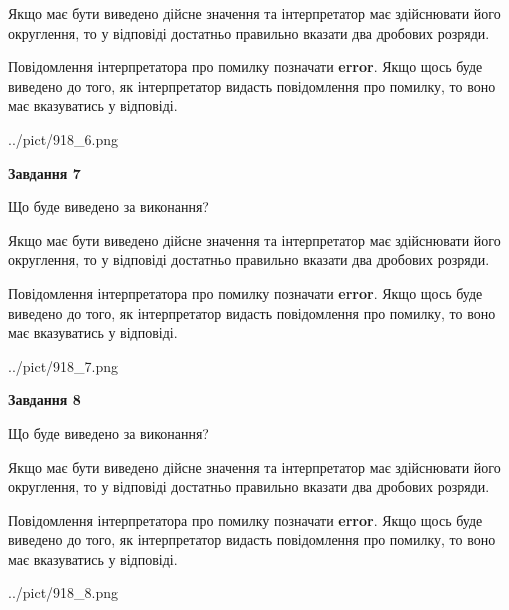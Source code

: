 \documentclass[12pt, ukrainian]{article}
\begin{document}
{\begin {Large}
Якщо має бути виведено дійсне значення та інтерпретатор має здійснювати його округлення, 
то у відповіді достатньо правильно вказати два дробових розряди.

Повідомлення інтерпретатора про помилку позначати \textbf{error}.
Якщо щось буде виведено до того, як інтерпретатор видасть повідомлення про помилку, 
то воно має вказуватись у відповіді. \par

\begin{center}
	{../pict/918_6.png}
\end{center}
\newpage

{\begin {center}\textbf{Завдання 7}\end {center}}\par
Що буде виведено за виконання? \par

Якщо має бути виведено дійсне значення та інтерпретатор має здійснювати його округлення, 
то у відповіді достатньо правильно вказати два дробових розряди.

Повідомлення інтерпретатора про помилку позначати \textbf{error}.
Якщо щось буде виведено до того, як інтерпретатор видасть повідомлення про помилку, 
то воно має вказуватись у відповіді. \par

\begin{center}
	{../pict/918_7.png}
\end{center}
\newpage

{\begin {center}\textbf{Завдання 8}\end {center}}\par
Що буде виведено за виконання? \par

Якщо має бути виведено дійсне значення та інтерпретатор має здійснювати його округлення, 
то у відповіді достатньо правильно вказати два дробових розряди.

Повідомлення інтерпретатора про помилку позначати \textbf{error}.
Якщо щось буде виведено до того, як інтерпретатор видасть повідомлення про помилку, 
то воно має вказуватись у відповіді. \par

\begin{center}
	{../pict/918_8.png}
\end{center}
\newpage


\end{Large}}
\end{document}

